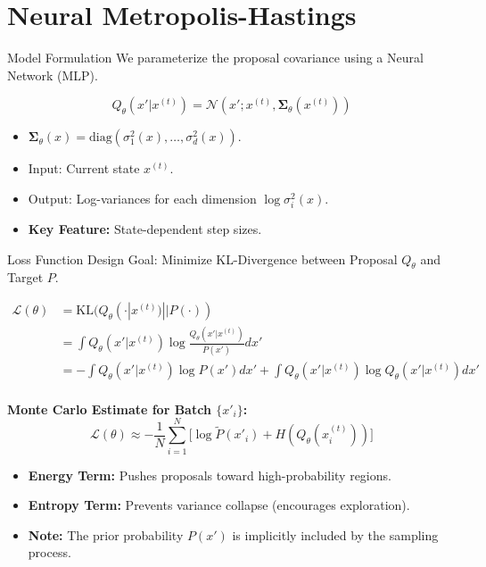 \documentclass[aspectratio=169]{beamer}
\begin{document}
\section{Neural Metropolis-Hastings}

\begin{frame}{Model Formulation}
    We parameterize the proposal covariance using a Neural Network (MLP).
    
    \begin{equation*}
        Q_\theta(x'|x^{(t)}) = \mathcal{N}\left(x'; x^{(t)}, \boldsymbol{\Sigma}_\theta(x^{(t)})\right)
    \end{equation*}
    
    \begin{itemize}
        \item $\boldsymbol{\Sigma}_\theta(x) = \text{diag}(\sigma_1^2(x), \dots, \sigma_d^2(x))$.
        \item Input: Current state $x^{(t)}$.
        \item Output: Log-variances for each dimension $\log \sigma_i^2(x)$.
        \item \textbf{Key Feature:} State-dependent step sizes.
    \end{itemize}
\end{frame}

\begin{frame}{Loss Function Design}
    Goal: Minimize KL-Divergence between Proposal $Q_\theta$ and Target $P$.
    
    $$
    \begin{aligned}
    \mathcal{L}(\theta) &= \text{KL}(Q_\theta( \cdot |x^{(t)}) || P(\cdot)) \\
    &= \int Q_\theta(x'|x^{(t)}) \log \frac{Q_\theta(x'|x^{(t)})}{P(x')} dx' \\
    &= -\int Q_\theta(x'|x^{(t)}) \log P(x') dx' + \int Q_\theta(x'|x^{(t)}) \log Q_\theta(x'|x^{(t)}) dx' \\
    \end{aligned}
    $$
    
    \vspace{0.3cm}
    \textbf{Monte Carlo Estimate for Batch $\{x'_i\}$:}
    $$ \mathcal{L}(\theta) \approx -\frac{1}{N} \sum_{i=1}^N \Big[\log \tilde{P}(x'_i) + H(Q_\theta(x^{(t)}_i))\Big] $$
    
    \begin{itemize}
        \item \textbf{Energy Term:} Pushes proposals toward high-probability regions.
        \item \textbf{Entropy Term:} Prevents variance collapse (encourages exploration).
        \item \textbf{Note:} The prior probability $P(x')$ is implicitly included by the sampling process.
    \end{itemize}
\end{frame}
\end{document}
